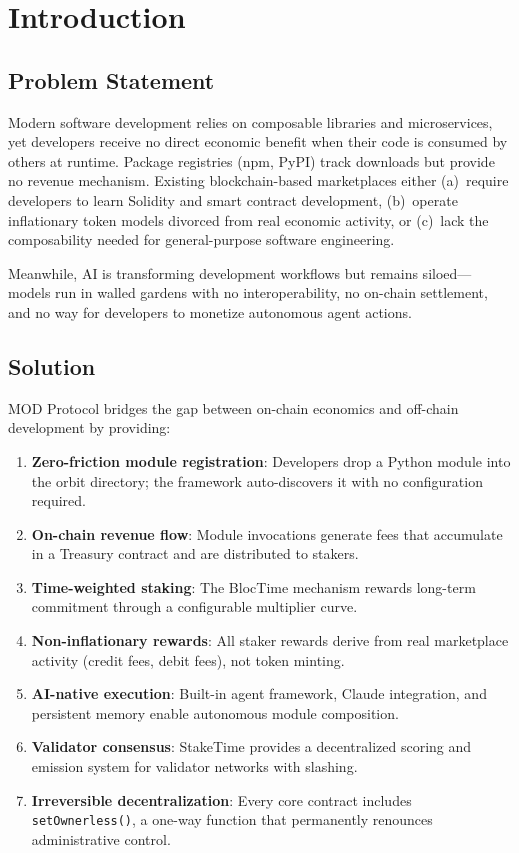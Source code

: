 \documentclass[11pt,a4paper]{article}
\begin{document}
\section{Introduction}
\label{sec:introduction}

\subsection{Problem Statement}

Modern software development relies on composable libraries and microservices, yet developers receive no direct economic benefit when their code is consumed by others at runtime. Package registries (npm, PyPI) track downloads but provide no revenue mechanism. Existing blockchain-based marketplaces either (a)~require developers to learn Solidity and smart contract development, (b)~operate inflationary token models divorced from real economic activity, or (c)~lack the composability needed for general-purpose software engineering.

Meanwhile, AI is transforming development workflows but remains siloed---models run in walled gardens with no interoperability, no on-chain settlement, and no way for developers to monetize autonomous agent actions.

\subsection{Solution}

MOD Protocol bridges the gap between on-chain economics and off-chain development by providing:

\begin{enumerate}[label=\arabic*.]
    \item \textbf{Zero-friction module registration}: Developers drop a Python module into the orbit directory; the framework auto-discovers it with no configuration required.
    \item \textbf{On-chain revenue flow}: Module invocations generate fees that accumulate in a Treasury contract and are distributed to stakers.
    \item \textbf{Time-weighted staking}: The BlocTime mechanism rewards long-term commitment through a configurable multiplier curve.
    \item \textbf{Non-inflationary rewards}: All staker rewards derive from real marketplace activity (credit fees, debit fees), not token minting.
    \item \textbf{AI-native execution}: Built-in agent framework, Claude integration, and persistent memory enable autonomous module composition.
    \item \textbf{Validator consensus}: StakeTime provides a decentralized scoring and emission system for validator networks with slashing.
    \item \textbf{Irreversible decentralization}: Every core contract includes \texttt{setOwnerless()}, a one-way function that permanently renounces administrative control.
\end{enumerate}
\end{document}
